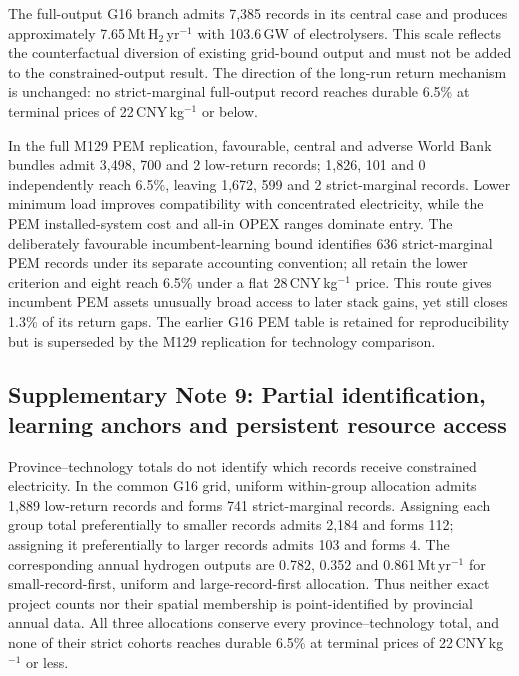 \documentclass[11pt,a4paper]{article}
\begin{document}
The full-output G16 branch admits 7,385 records in its central case and produces approximately 7.65\,Mt\,H$_2$\,yr$^{-1}$ with 103.6\,GW of electrolysers. This scale reflects the counterfactual diversion of existing grid-bound output and must not be added to the constrained-output result. The direction of the long-run return mechanism is unchanged: no strict-marginal full-output record reaches durable 6.5\% at terminal prices of 22\,CNY\,kg$^{-1}$ or below.

In the full M129 PEM replication, favourable, central and adverse World Bank bundles admit 3,498, 700 and 2 low-return records; 1,826, 101 and 0 independently reach 6.5\%, leaving 1,672, 599 and 2 strict-marginal records. Lower minimum load improves compatibility with concentrated electricity, while the PEM installed-system cost and all-in OPEX ranges dominate entry. The deliberately favourable incumbent-learning bound identifies 636 strict-marginal PEM records under its separate accounting convention; all retain the lower criterion and eight reach 6.5\% under a flat 28\,CNY\,kg$^{-1}$ price. This route gives incumbent PEM assets unusually broad access to later stack gains, yet still closes 1.3\% of its return gaps. The earlier G16 PEM table is retained for reproducibility but is superseded by the M129 replication for technology comparison.

\subsection*{Supplementary Note 9: Partial identification, learning anchors and persistent resource access}

Province--technology totals do not identify which records receive constrained electricity. In the common G16 grid, uniform within-group allocation admits 1,889 low-return records and forms 741 strict-marginal records. Assigning each group total preferentially to smaller records admits 2,184 and forms 112; assigning it preferentially to larger records admits 103 and forms 4. The corresponding annual hydrogen outputs are 0.782, 0.352 and 0.861\,Mt\,yr$^{-1}$ for small-record-first, uniform and large-record-first allocation. Thus neither exact project counts nor their spatial membership is point-identified by provincial annual data. All three allocations conserve every province--technology total, and none of their strict cohorts reaches durable 6.5\% at terminal prices of 22\,CNY\,kg$^{-1}$ or less.
\end{document}
